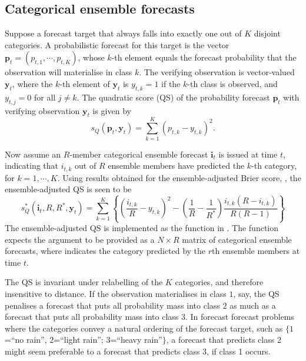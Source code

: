 \documentclass[article]{jss}\usepackage[]{graphicx}\usepackage[]{color}
\begin{document}
\subsection{Categorical ensemble forecasts}

Suppose a forecast target that always falls into exactly one out of $K$ disjoint categories.
A probabilistic forecast for this target is the vector $\mathbf{p}_t = (p_{t,1}, \cdots, p_{t,K})$, whose $k$-th element equals the forecast probability that the observation will materialise in class $k$.
The verifying observation is vector-valued $\mathbf{y}_t$, where the $k$-th element of $\mathbf{y}_t$ is $y_{t,k}=1$ if the $k$-th class is observed, and $y_{t,j}=0$ for all $j\neq k$. 
The quadratic score (QS) of the probability forecast $\mathbf{p}_t$ with verifying observation $\mathbf{y}_t$ is given by
%
\begin{equation}
s_{Q}(\mathbf{p}_t, \mathbf{y}_t) = \sum_{k=1}^K \left(p_{t,k} - y_{t,k}\right)^2.
\end{equation}


Now assume an $R$-member categorical ensemble forecast $\mathbf{i}_t$ is issued at time $t$, indicating that $i_{t,k}$ out of $R$ ensemble members have predicted the $k$-th category, for $k=1,\cdots,K$.
Using results obtained for the ensemble-adjusted Brier score, \citep[see also][]{ferro2008effect}, the ensemble-adjusted QS is seen to be
%
\begin{equation}
s_{Q}^*(\mathbf{i}_t, R, R^*, \mathbf{y}_t) = \sum_{k=1}^K \left\{ \left(\frac{i_{t,k}}{R} - y_{t,k}\right)^2 - \left(\frac{1}{R} - \frac{1}{R^*}\right) \frac{i_{t,k}(R-i_{t,k})}{R(R-1)}\right\}
\end{equation}
%
The ensemble-adjusted QS is implemented as the function  in .
The function expects the argument  to be provided as a $N\times R$ matrix of categorical ensemble forecasts, where  indicates the category predicted by the $r$th ensemble members at time $t$. 

The QS is invariant under relabelling of the $K$ categories, and therefore insensitive to distance. 
If the observation materialises in class $1$, say, the QS penalises a forecast that puts all probability mass into class $2$ as much as a forecast that puts all probability mass into class $3$.
In forecast forecast problems where the categories convey a natural ordering of the forecast target, such as $\{1$=``no rain'', $2$=``light rain''; $3$=``heavy rain''$\}$, a forecast that predicts class 2 might seem preferable to a forecast that predicts class 3, if class 1 occurs. 
\end{document}
